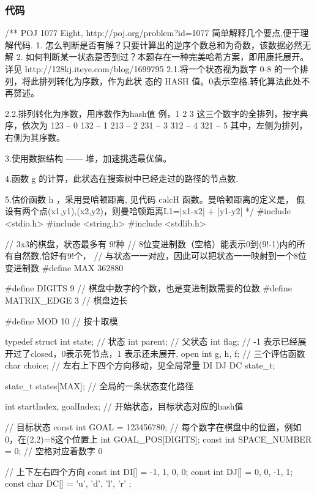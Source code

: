 \subsubsection{代码}
\begin{Codex}[label=eight_digits_astar.c]
/** POJ 1077 Eight, http://poj.org/problem?id=1077
 简单解释几个要点,便于理解代码.
 1. 怎么判断是否有解？只要计算出的逆序个数总和为奇数，该数据必然无解
 2. 如何判断某一状态是否到过？本题存在一种完美哈希方案，即用康托展开。
    详见 http://128kj.iteye.com/blog/1699795
    2.1.将一个状态视为数字 0-8 的一个排列，将此排列转化为序数，作为此状
 态的 HASH 值。0表示空格.转化算法此处不再赘述。

    2.2.排列转化为序数，用序数作为hash值
    例，1 2 3 这三个数字的全排列，按字典序，依次为
 123 -- 0
 132 -- 1
 213 -- 2
 231 -- 3
 312 -- 4
 321 -- 5
 其中，左侧为排列，右侧为其序数。

 3.使用数据结构 —— 堆，加速挑选最优值。

 4.函数 g 的计算，此状态在搜索树中已经走过的路径的节点数.

 5.估价函数 h ，采用曼哈顿距离, 见代码 calcH 函数。曼哈顿距离的定义是，
 假设有两个点(x1,y1),(x2,y2)，则曼哈顿距离L1=|x1-x2| + |y1-y2|
 */
#include <stdio.h>
#include <string.h>
#include <stdlib.h>

// 3x3的棋盘，状态最多有 9!种
// 8位变进制数（空格）能表示0到(9!-1)内的所有自然数,恰好有9!个，
// 与状态一一对应，因此可以把状态一一映射到一个8位变进制数
#define     MAX         362880

#define DIGITS 9 // 棋盘中数字的个数，也是变进制数需要的位数
#define     MATRIX_EDGE 3       // 棋盘边长

#define     MOD         10      // 按十取模

typedef struct {
    int state; // 状态
    int parent;     // 父状态
    int flag;   // -1 表示已经展开过了closed，0表示死节点，1 表示还未展开, open
    int g, h, f; // 三个评估函数
    char choice;  // 左右上下四个方向移动，见全局常量 DI DJ DC
} state_t;

state_t states[MAX];  // 全局的一条状态变化路径

int  startIndex, goalIndex; // 开始状态，目标状态对应的hash值

// 目标状态
const int GOAL = 123456780;
// 每个数字在棋盘中的位置，例如0，在(2,2)=8这个位置上
int GOAL_POS[DIGITS];
const int SPACE_NUMBER = 0; // 空格对应着数字 0

// 上下左右四个方向
const int DI[] = {-1, 1, 0, 0};
const int DJ[] = {0, 0, -1, 1};
const char DC[] = { 'u', 'd', 'l', 'r' };


\end{Codex}
